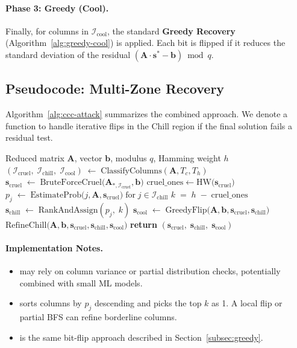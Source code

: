 \documentclass[conference]{IEEEtran}
\begin{document}
\paragraph{Phase 3: Greedy (Cool).}
Finally, for columns in $\mathcal{I}_{\mathrm{cool}}$, the standard \textbf{Greedy Recovery} (Algorithm~\ref{alg:greedy-cool}) is applied. Each bit is flipped if it reduces the standard deviation of the residual $(\mathbf{A}\cdot \mathbf{s}^* - \mathbf{b})\bmod q$. 

\subsection{Pseudocode: Multi-Zone Recovery}
\label{subsec:multi-zone-pseudocode}

Algorithm~\ref{alg:ccc-attack} summarizes the combined approach. We denote a function  to handle iterative flips in the Chill region if the final solution fails a residual test.

\begin{algorithm}[ht]
\caption{\small Multi-Zone Attack: Cool, Chill, and Cruel}
\label{alg:ccc-attack}
\begin{algorithmic}[1]
\Require Reduced matrix $\mathbf{A}$, vector $\mathbf{b}$, modulus $q$, Hamming weight $h$
\State $(\mathcal{I}_{\mathrm{cruel}},\;\mathcal{I}_{\mathrm{chill}},\;\mathcal{I}_{\mathrm{cool}}) \;\gets\; \text{ClassifyColumns}(\mathbf{A}, T_c, T_h)$
\State $\mathbf{s}_{\mathrm{cruel}} \;\gets\; \mathrm{BruteForceCruel}\bigl(\mathbf{A}_{*,\mathcal{I}_{\mathrm{cruel}}}, \mathbf{b}\bigr)$
\State $\mathrm{cruel\_ones} \gets \mathrm{HW}\bigl(\mathbf{s}_{\mathrm{cruel}}\bigr)$
\State $p_j \;\gets\; \mathrm{EstimateProb}\bigl(j,\mathbf{A},\mathbf{s}_{\mathrm{cruel}}\bigr)\; \text{for}\; j\in \mathcal{I}_{\mathrm{chill}}$
\State $k \;=\; h \;-\; \mathrm{cruel\_ones}$
\State $\mathbf{s}_{\mathrm{chill}} \;\gets\; \mathrm{RankAndAssign}(p_j,\;k)$
\State $\mathbf{s}_{\mathrm{cool}} \;\gets\; \mathrm{GreedyFlip}\bigl(\mathbf{A},\mathbf{b},\mathbf{s}_{\mathrm{cruel}},\mathbf{s}_{\mathrm{chill}}\bigr)$
\State $\mathrm{RefineChill}\bigl(\mathbf{A},\mathbf{b},\mathbf{s}_{\mathrm{cruel}},\mathbf{s}_{\mathrm{chill}},\mathbf{s}_{\mathrm{cool}}\bigr)$
\State \textbf{return} $(\mathbf{s}_{\mathrm{cruel}},\;\mathbf{s}_{\mathrm{chill}},\;\mathbf{s}_{\mathrm{cool}})$
\end{algorithmic}
\end{algorithm}

\paragraph{Implementation Notes.}
\begin{itemize}
\item {} may rely on column variance or partial distribution checks, potentially combined with small ML models.
\item {} sorts columns by $p_j$ descending and picks the top $k$ as 1. A local flip or partial BFS can refine borderline columns.
\item {} is the same bit-flip approach described in Section~\ref{subsec:greedy}. 
\end{itemize}
\end{document}
